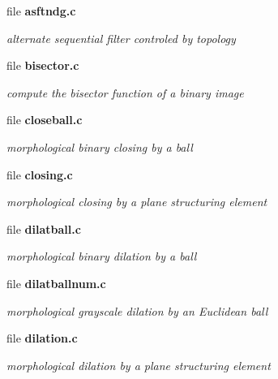 \begin{CompactItemize}
\item 
file \bf{asftndg.c}
\begin{CompactList}\small\item\em alternate sequential filter controled by topology \item\end{CompactList}

\item 
file \bf{bisector.c}
\begin{CompactList}\small\item\em compute the bisector function of a binary image \item\end{CompactList}

\item 
file \bf{closeball.c}
\begin{CompactList}\small\item\em morphological binary closing by a ball \item\end{CompactList}

\item 
file \bf{closing.c}
\begin{CompactList}\small\item\em morphological closing by a plane structuring element \item\end{CompactList}

\item 
file \bf{dilatball.c}
\begin{CompactList}\small\item\em morphological binary dilation by a ball \item\end{CompactList}

\item 
file \bf{dilatballnum.c}
\begin{CompactList}\small\item\em morphological grayscale dilation by an Euclidean ball \item\end{CompactList}

\item 
file \bf{dilation.c}
\begin{CompactList}\small\item\em morphological dilation by a plane structuring element \item\end{CompactList}


\end{CompactItemize}
